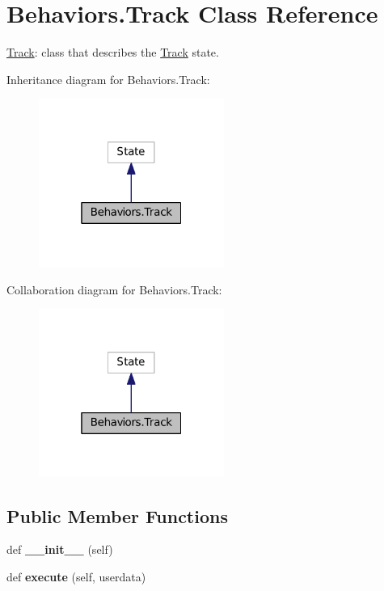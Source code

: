 \hypertarget{classBehaviors_1_1Track}{}\section{Behaviors.\+Track Class Reference}
\label{classBehaviors_1_1Track}


\hyperlink{classBehaviors_1_1Track}{Track}\+: class that describes the \hyperlink{classBehaviors_1_1Track}{Track} state.  




Inheritance diagram for Behaviors.\+Track\+:\nopagebreak
\begin{figure}[H]
\begin{center}
\leavevmode
\includegraphics[width=172pt]{classBehaviors_1_1Track__inherit__graph}
\end{center}
\end{figure}


Collaboration diagram for Behaviors.\+Track\+:\nopagebreak
\begin{figure}[H]
\begin{center}
\leavevmode
\includegraphics[width=172pt]{classBehaviors_1_1Track__coll__graph}
\end{center}
\end{figure}
\subsection*{Public Member Functions}
\begin{DoxyCompactItemize}
\item 
def {\bfseries \+\_\+\+\_\+init\+\_\+\+\_\+} (self)\hypertarget{classBehaviors_1_1Track_ad4b822d13b3152463dfae09b7857cafe}{}\label{classBehaviors_1_1Track_ad4b822d13b3152463dfae09b7857cafe}

\item 
def {\bfseries execute} (self, userdata)\hypertarget{classBehaviors_1_1Track_a35b652d080f4b24379d06d0875c60658}{}\label{classBehaviors_1_1Track_a35b652d080f4b24379d06d0875c60658}

\end{DoxyCompactItemize}


